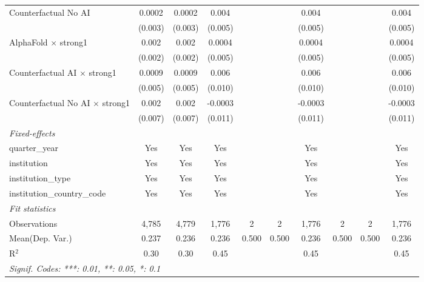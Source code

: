 \begin{tabular}{lccccccccc}
   Counterfactual No AI                   & 0.0002        & 0.0002        & 0.004       &     &     & 0.004       &     &     & 0.004\\   
                                          & (0.003)       & (0.003)       & (0.005)     &     &     & (0.005)     &     &     & (0.005)\\   
   AlphaFold $\times$ strong1             & 0.002         & 0.002         & 0.0004      &     &     & 0.0004      &     &     & 0.0004\\   
                                          & (0.002)       & (0.002)       & (0.005)     &     &     & (0.005)     &     &     & (0.005)\\   
   Counterfactual AI $\times$ strong1     & 0.0009        & 0.0009        & 0.006       &     &     & 0.006       &     &     & 0.006\\   
                                          & (0.005)       & (0.005)       & (0.010)     &     &     & (0.010)     &     &     & (0.010)\\   
   Counterfactual No AI $\times$ strong1  & 0.002         & 0.002         & -0.0003     &     &     & -0.0003     &     &     & -0.0003\\   
                                          & (0.007)       & (0.007)       & (0.011)     &     &     & (0.011)     &     &     & (0.011)\\   
   \midrule
   \emph{Fixed-effects}\\
   quarter\_year                          & Yes           & Yes           & Yes         &     &     & Yes         &     &     & Yes\\  
   institution                            & Yes           & Yes           & Yes         &     &     & Yes         &     &     & Yes\\  
   institution\_type                      & Yes           & Yes           & Yes         &     &     & Yes         &     &     & Yes\\  
   institution\_country\_code             & Yes           & Yes           & Yes         &     &     & Yes         &     &     & Yes\\  
   \midrule
   \emph{Fit statistics}\\
   Observations                           & 4,785         & 4,779         & 1,776       & 2   & 2   & 1,776       & 2   & 2   & 1,776\\  
Mean(Dep. Var.) & 0.237 & 0.236 & 0.236 & 0.500 & 0.500 & 0.236 & 0.500 & 0.500 & 0.236 \\
   R$^2$                                  & 0.30          & 0.30          & 0.45        &     &     & 0.45        &     &     & 0.45\\  
   \midrule \midrule
   \multicolumn{10}{l}{\emph{Signif. Codes: ***: 0.01, **: 0.05, *: 0.1}}\\
\end{tabular}
\par\endgroup
